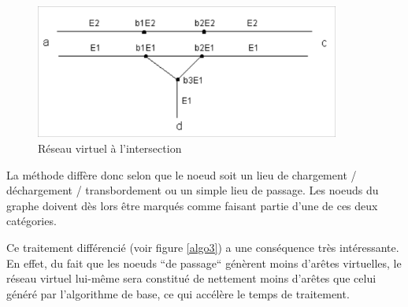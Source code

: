 \begin{figure}[htbp]
\centerline{\includegraphics[width=10cm]{f3_9.png}}
\caption{\label{f3_9} R\'eseau virtuel \`a l'intersection}
\end{figure}



La méthode diffère donc selon que le noeud soit un lieu de chargement /
dé\-char\-ge\-ment / transbordement ou un simple lieu de passage. Les noeuds du
graphe doivent dès lors être marqués comme faisant partie d'une de ces deux
catégories.

Ce traitement différencié (voir figure \ref{algo3}) a une conséquence très
intéressante. En effet, du fait que les noeuds ``de passage`` génèrent moins
d'arêtes virtuelles, le réseau virtuel lui-même sera constitué de nettement
moins d'arêtes que celui généré par l'algorithme de base, ce qui accélère le
temps de traitement.


